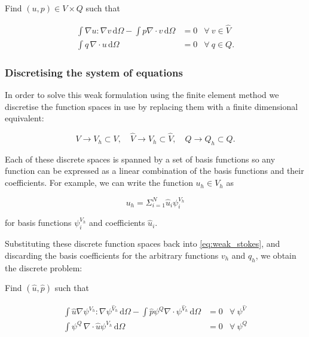 \documentclass[thesis]{subfiles}
\begin{document}
\vspace{1em}

Find $(u, p) \in V \times Q$ such that

\begin{subequations}
  \begin{align}
    \int \nabla u : \nabla v \, \textrm{d}\Omega
    - \int p \nabla \cdot v \, \textrm{d}\Omega
    &= 0
    &\forall \ v \in \hat V
    \label{eq:weak_stokes_V} \\
    \int q \, \nabla \cdot u \, \textrm{d}\Omega
    &= 0
    &\forall \ q \in Q.
    \label{eq:weak_stokes_Q}
  \end{align}
  \label{eq:weak_stokes}
\end{subequations}

\subsubsection{Discretising the system of equations}

In order to solve this weak formulation using the finite element method we discretise the function spaces in use by replacing them with a finite dimensional equivalent:

\begin{equation*}
  V \to V_h \subset V,
  \quad
  \hat V \to \hat V_h \subset \hat V,
  \quad
  Q \to Q_h \subset Q.
\end{equation*}

Each of these discrete spaces is spanned by a set of basis functions so any function can be expressed as a linear combination of the basis functions and their coefficients.
For example, we can write the function $u_h \in V_h$ as

\begin{equation*}
  u_h = \Sigma^N_{i=1} \hat u_i \psi^{V_h}_i
\end{equation*}

for basis functions $\psi^{V_h}_i$ and coefficients $\hat u_i$.

Substituting these discrete function spaces back into \cref{eq:weak_stokes}, and discarding the basis coefficients for the arbitrary functions $v_h$ and $q_h$, we obtain the discrete problem:

\vspace{1em}

Find $(\hat u, \hat p)$ such that

\begin{subequations}
  \begin{align}
    \int \hat u \nabla \psi^{V_h} : \nabla \psi^{\hat V_h} \, \textrm{d}\Omega
    - \int \hat p \psi^Q \nabla \cdot \psi^{\hat V_h} \, \textrm{d}\Omega
    &= 0
    &\forall \ \psi^{\hat V} \\
    \int \psi^Q \, \nabla \cdot \hat u \psi^{V_h} \, \textrm{d}\Omega
    &= 0
    &\forall \ \psi^{Q}
  \end{align}
  \label{eq:weak_stokes_discrete}
\end{subequations}
\end{document}
